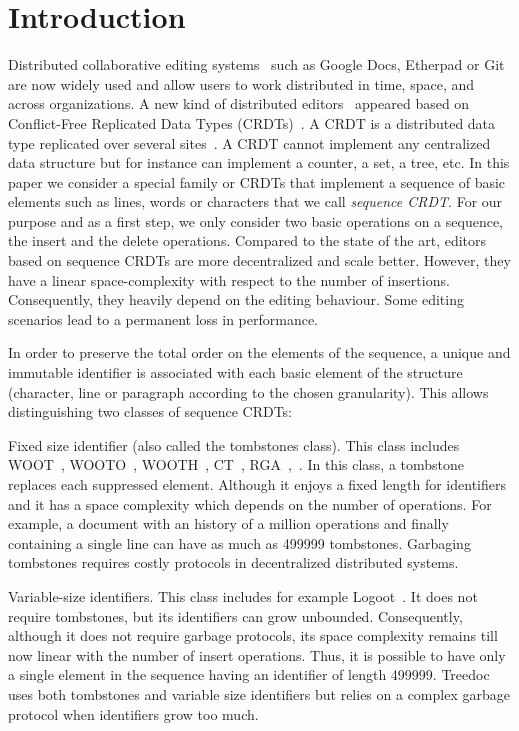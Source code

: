 \section{Introduction}

Distributed collaborative editing
systems~\cite{Ellis:1989:CCG:67544.66963,ellis1991groupware,greenberg1994real}
such as Google Docs, Etherpad or Git are now widely used and allow users to
work distributed in time, space, and across organizations. A new kind of
distributed editors~\cite{preguica2009commutative,weiss2007wooki} appeared
based on Conflict-Free Replicated Data Types
(CRDTs)~\cite{oster2006data,weiss2009logoot,shapiro2011conflict}. A CRDT is a
distributed data type replicated over several
sites~\cite{saito2005optimistic,saito2002replication}. A CRDT cannot implement
any centralized data structure but for instance can implement a counter, a set,
a tree, etc. In this paper we consider a special family or CRDTs that implement
a sequence of basic elements such as lines, words or characters that we call
\emph{sequence CRDT}. For our purpose and as a first step, we only consider two
basic operations on a sequence, the insert and the delete operations. Compared
to the state of the art, editors based on sequence CRDTs are more decentralized
and scale better. However, they have a linear space-complexity with respect to
the number of insertions. Consequently, they heavily depend on the editing
behaviour. Some editing scenarios lead to a permanent loss in performance.

In order to preserve the total order on the elements of the sequence, a unique
and immutable identifier is associated with each basic element of the structure
(character, line or paragraph according to the chosen granularity). This allows
distinguishing two classes of sequence CRDTs:
\begin{inparaenum}[(i)]
\item Fixed size identifier (also called the tombstones class). This class
  includes WOOT~\cite{oster2006data}, WOOTO~\cite{weiss2007wooki},
  WOOTH~\cite{ahmed2011evaluating}, CT~\cite{grishchenko2010deep},
  RGA~\cite{roh2011replicated},~\cite{Yu2012stringwise}. In this class, a
  tombstone replaces each suppressed element. Although it enjoys a fixed length
  for identifiers and it has a space complexity which depends on the number of
  operations. For example, a document with an history of a million operations
  and finally containing a single line can have as much as 499999
  tombstones. Garbaging tombstones requires costly protocols in decentralized
  distributed systems.
\item Variable-size identifiers. This class includes for example
  Logoot~\cite{weiss2009logoot}. It does not require tombstones, but its
  identifiers can grow unbounded. Consequently, although it does not require
  garbage protocols, its space complexity remains till now linear with the
  number of insert operations. Thus, it is possible to have only a single
  element in the sequence having an identifier of length
  499999. Treedoc~\cite{preguica2009commutative} uses both tombstones and
  variable size identifiers but relies on a complex garbage protocol when
  identifiers grow too much.
\end{inparaenum}

